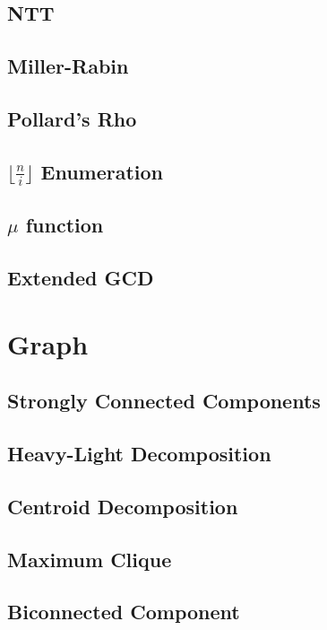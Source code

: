 \documentclass[a4paper,10pt,twocolumn,oneside]{article}
\begin{document}
\subsection{NTT}

\subsection{Miller-Rabin}

\subsection{Pollard's Rho}

\subsection{$\lfloor \frac{n}{i} \rfloor$ Enumeration}

\subsection{$\mu$ function}

\subsection{Extended GCD}

\section{Graph}
\subsection{Strongly Connected Components}

\subsection{Heavy-Light Decomposition}

\subsection{Centroid Decomposition}

\subsection{Maximum Clique}

\subsection{Biconnected Component}

\end{document}

